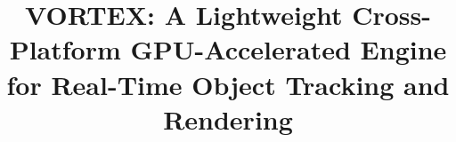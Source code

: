 \title{VORTEX: A Lightweight Cross-Platform GPU-Accelerated Engine for Real-Time Object Tracking and Rendering}
\renewcommand{\shorttitle}{VORTEX: GPU-Accelerated Real-Time Tracking Engine}

